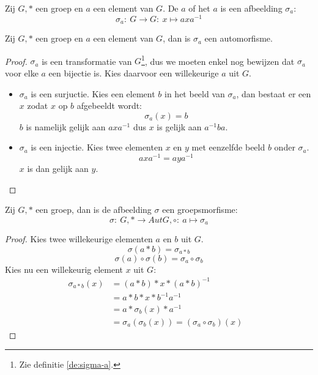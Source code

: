 \documentclass[main.tex]{subfiles}
\begin{document}
\begin{de}
  \label{de:sigma-a}
  Zij $G,*$ een groep en $a$ een element van $G$.
  De  $a$ of het  $a$ is een afbeelding $\sigma_{a}$:
  \[ \sigma_{a}:\ G \rightarrow G:\ x \mapsto axa^{-1} \]
\end{de}

\begin{ei}
  Zij $G,*$ een groep en $a$ een element van $G$, dan is $\sigma_{a}$ een automorfisme.
  
  \begin{proof}
    $\sigma_{a}$ is een transformatie van $G$\footnote{Zie definitie \ref{de:sigma-a}.}, dus we moeten enkel nog bewijzen dat $\sigma_{a}$ voor elke $a$ een bijectie is.
    Kies daarvoor een willekeurige $a$ uit $G$.
    \begin{itemize}
    \item $\sigma_{a}$ is een surjuctie.
      Kies een element $b$ in het beeld van $\sigma_{a}$, dan bestaat er een $x$ zodat $x$ op $b$ afgebeeldt wordt:
      \[ \sigma_{a}(x) = b \]
      $b$ is namelijk gelijk aan $axa^{-1}$ dus $x$ is gelijk aan $a^{-1}ba$.
    \item $\sigma_{a}$ is een injectie.
      Kies twee elementen $x$ en $y$ met eenzelfde beeld $b$ onder $\sigma_{a}$.
      \[ axa^{-1} = aya^{-1} \]
      $x$ is dan gelijk aan $y$.
    \end{itemize}
  \end{proof}
\end{ei}

\begin{ei}
  Zij $G,*$ een groep, dan is de afbeelding $\sigma$ een groepsmorfisme:
  \[ \sigma:\ G,* \rightarrow Aut G,\circ:\ a \mapsto \sigma_{a} \]

  \begin{proof}
    Kies twee willekeurige elementen $a$ en $b$ uit $G$.
    \[ \sigma(a * b) = \sigma_{a * b}\]
    \[ \sigma(a) \circ \sigma(b) = \sigma_{a} \circ \sigma_{b} \]
    Kies nu een willekeurig element $x$ uit $G$:
    \[
    \begin{array}{rll}
      \sigma_{a * b}(x) &= (a*b)*x*(a*b)^{-1} &\\
                       &= a*b*x*b^{-1}a^{-1} &\\
                       &= a*\sigma_{b}(x)*a^{-1} &\\
                       &= \sigma_{a}(\sigma_{b}(x)) = (\sigma_{a} \circ \sigma_{b})(x)      
    \end{array}
    \]
  \end{proof}
\end{ei}
\end{document}
